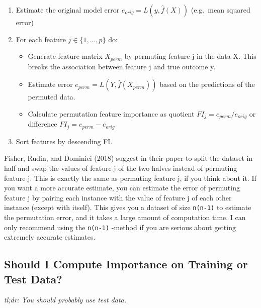 \documentclass[
  11pt,
]{scrbook}
\providecommand{\tightlist}{%
  \setlength{\itemsep}{0pt}\setlength{\parskip}{0pt}}
\begin{document}
\begin{enumerate}
\def\labelenumi{\arabic{enumi}.}
\tightlist
\item
  Estimate the original model error \(e_{orig} = L(y, \hat{f}(X))\) (e.g.~mean squared error)
\item
  For each feature \(j \in \{1,...,p\}\) do:

  \begin{itemize}
  \tightlist
  \item
    Generate feature matrix \(X_{perm}\) by permuting feature j in the data X. This breaks the association between feature j and true outcome y.
  \item
    Estimate error \(e_{perm} = L(Y,\hat{f}(X_{perm}))\) based on the predictions of the permuted data.
  \item
    Calculate permutation feature importance as quotient \(FI_j= e_{perm}/e_{orig}\) or difference \(FI_j = e_{perm}- e_{orig}\)
  \end{itemize}
\item
  Sort features by descending FI.
\end{enumerate}

Fisher, Rudin, and Dominici (2018) suggest in their paper to split the dataset in half and swap the values of feature j of the two halves instead of permuting feature j.
This is exactly the same as permuting feature j, if you think about it.
If you want a more accurate estimate, you can estimate the error of permuting feature j by pairing each instance with the value of feature j of each other instance (except with itself).
This gives you a dataset of size \texttt{n(n-1)} to estimate the permutation error, and it takes a large amount of computation time.
I can only recommend using the \texttt{n(n-1)} -method if you are serious about getting extremely accurate estimates.

\hypertarget{feature-importance-data}{%
\subsection{Should I Compute Importance on Training or Test Data?}\label{feature-importance-data}}

\emph{tl;dr: You should probably use test data.}
\end{document}
